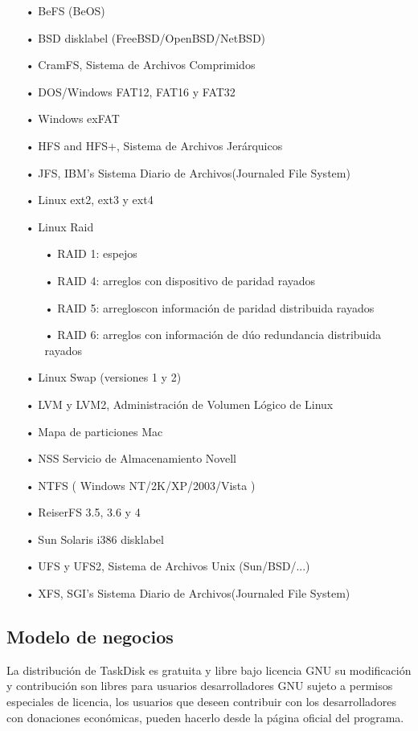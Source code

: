 \documentclass[10pt,a4paper]{article}
\begin{document}
\begin{itemize}
\item[•]BeFS (BeOS)
\item[•]BSD disklabel (FreeBSD/OpenBSD/NetBSD)
\item[•]CramFS, Sistema de Archivos Comprimidos
\item[•]DOS/Windows FAT12, FAT16 y FAT32
\item[•]Windows exFAT
\item[•]HFS and HFS+, Sistema de Archivos Jerárquicos
\item[•]JFS, IBM's Sistema Diario de Archivos(Journaled File System)
\item[•]Linux ext2, ext3 y ext4
\item[•]Linux Raid
\begin{itemize}
\item[•]RAID 1: espejos
\item[•]RAID 4: arreglos con dispositivo de paridad rayados
\item[•]RAID 5: arregloscon información de paridad distribuida rayados
\item[•]RAID 6: arreglos con información de dúo redundancia distribuida rayados
\end{itemize}
\item[•]Linux Swap (versiones 1 y 2)
\item[•]LVM y LVM2, Administración de Volumen Lógico de Linux
\item[•]Mapa de particiones Mac
\item[•]NSS Servicio de Almacenamiento Novell
\item[•]NTFS ( Windows NT/2K/XP/2003/Vista )
\item[•]ReiserFS 3.5, 3.6 y 4
\item[•]Sun Solaris i386 disklabel
\item[•]UFS y UFS2, Sistema de Archivos Unix (Sun/BSD/...)
\item[•]XFS, SGI's Sistema Diario de Archivos(Journaled File System)
\end{itemize}
\subsection{Modelo de negocios}
La distribución de TaskDisk  es gratuita y libre bajo licencia GNU su modificación y contribución son libres para usuarios desarrolladores GNU sujeto a permisos especiales de licencia, los usuarios que deseen contribuir con los desarrolladores con donaciones económicas, pueden hacerlo desde la página oficial del programa. \\
\end{document}
